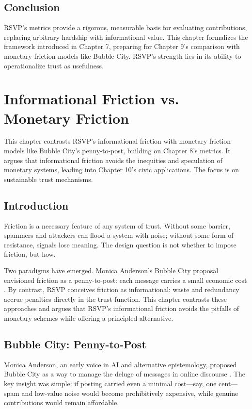 \documentclass[openany]{book}
\begin{document}
\section{Conclusion}

RSVP’s metrics provide a rigorous, measurable basis for evaluating contributions, replacing arbitrary hardship with informational value. This chapter formalizes the framework introduced in Chapter 7, preparing for Chapter 9’s comparison with monetary friction models like Bubble City. RSVP’s strength lies in its ability to operationalize trust as usefulness.

\chapter{Informational Friction vs.\\ Monetary Friction}

This chapter contrasts RSVP’s informational friction with monetary friction models like Bubble City’s penny-to-post, building on Chapter 8’s metrics. It argues that informational friction avoids the inequities and speculation of monetary systems, leading into Chapter 10’s civic applications. The focus is on sustainable trust mechanisms.

\section{Introduction}

Friction is a necessary feature of any system of trust. Without some barrier, spammers and attackers can flood a system with noise; without some form of resistance, signals lose meaning. The design question is not whether to impose friction, but how.

Two paradigms have emerged. Monica Anderson’s Bubble City proposal envisioned friction as a penny-to-post: each message carries a small economic cost \cite{anderson2022}. By contrast, RSVP conceives friction as informational: waste and redundancy accrue penalties directly in the trust function. This chapter contrasts these approaches and argues that RSVP’s informational friction avoids the pitfalls of monetary schemes while offering a principled alternative.

\section{Bubble City: Penny-to-Post}

Monica Anderson, an early voice in AI and alternative epistemology, proposed Bubble City as a way to manage the deluge of messages in online discourse \cite{anderson2022}. The key insight was simple: if posting carried even a minimal cost---say, one cent---spam and low-value noise would become prohibitively expensive, while genuine contributions would remain affordable.
\end{document}

